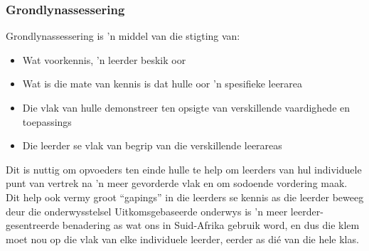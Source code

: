 \subsubsection{Grondlynassessering}
Grondlynassessering is 'n middel van die stigting van:

\begin{itemize}[noitemsep]
\item
  Wat voorkennis, 'n leerder beskik oor
\item
  Wat is die mate van kennis is dat hulle oor 'n spesifieke leerarea
\item
  Die vlak van hulle demonstreer ten opsigte van verskillende vaardighede en toepassings
\item
  Die leerder se vlak van begrip van die verskillende leerareas
\end{itemize}
Dit is nuttig om opvoeders ten einde hulle te help om leerders van hul individuele punt van vertrek na 'n meer gevorderde vlak en om sodoende vordering maak. Dit help ook vermy groot ``gapings'' in die leerders se kennis as die leerder beweeg deur die onderwysstelsel Uitkomsgebaseerde onderwys is 'n meer leerder-gesentreerde benadering as wat ons in Suid-Afrika gebruik word, en dus die klem moet nou op die vlak van elke individuele leerder, eerder as di\'{e} van die hele klas.

